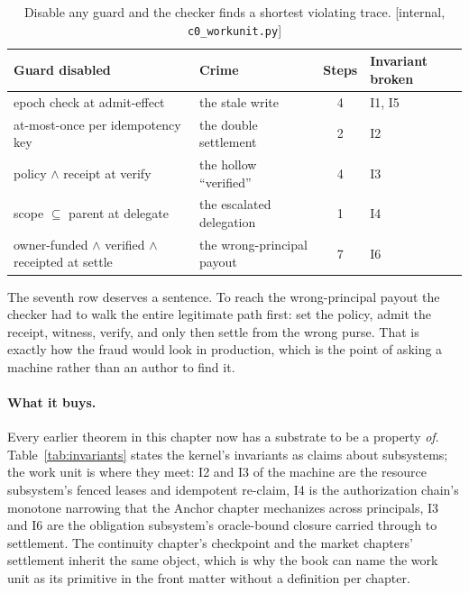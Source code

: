 \documentclass[11pt,a4paper]{article}
\theoremstyle{definition}
\theoremstyle{remark}
\begin{document}
\begin{table}[H]
\centering
\caption{Disable any guard and the checker finds a shortest violating trace.
[internal, \texttt{c0\_workunit.py}]}
\label{tab:workunit-crimes}
\small
\begin{tabularx}{\textwidth}{@{}>{\raggedright\arraybackslash}X >{\raggedright\arraybackslash}X cl@{}}
\toprule
\textbf{Guard disabled} & \textbf{Crime} & \textbf{Steps} & \textbf{Invariant broken} \\
\midrule
epoch check at admit-effect & the stale write & 4 & I1, I5 \\
at-most-once per idempotency key & the double settlement & 2 & I2 \\
policy $\wedge$ receipt at verify & the hollow ``verified'' & 4 & I3 \\
scope $\subseteq$ parent at delegate & the escalated delegation & 1 & I4 \\
owner-funded $\wedge$ verified $\wedge$ receipted at settle & the wrong-principal payout & 7 & I6 \\
\bottomrule
\end{tabularx}
\end{table}

The seventh row deserves a sentence. To reach the wrong-principal payout the checker had to
walk the entire legitimate path first: set the policy, admit the receipt, witness, verify,
and only then settle from the wrong purse. That is exactly how the fraud would look in
production, which is the point of asking a machine rather than an author to find it.

\paragraph{What it buys.}
Every earlier theorem in this chapter now has a substrate to be a property \emph{of}.
Table~\ref{tab:invariants} states the kernel's invariants as claims about subsystems; the work
unit is where they meet: I2 and I3 of the machine are the resource subsystem's fenced leases and
idempotent re-claim, I4 is the authorization chain's monotone narrowing that the Anchor chapter
mechanizes across principals, I3 and I6 are the obligation subsystem's oracle-bound closure
carried through to settlement. The continuity chapter's checkpoint and the market chapters'
settlement inherit the same object, which is why the book can name the work unit as its
primitive in the front matter without a definition per chapter.
\end{document}
